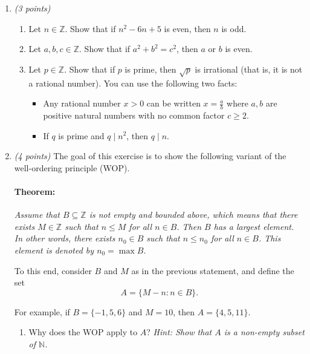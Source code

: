 \documentclass[11pt]{article}
\begin{document}
\begin{enumerate}

\item \emph{(3 points)}

\begin{enumerate}
\item Let \(n \in \mathbb{Z}\). Show that if \(n^2 - 6n + 5\) is even, then \(n\) is odd.\newline
\item Let \(a, b, c \in \mathbb{Z}\). Show that if \(a^2 + b^2 = c^2\), then \(a\) or \(b\) is even.\newline
\item Let \(p \in \mathbb{Z}\). Show that if \(p\) is prime, then \(\sqrt{p}\) is irrational (that is, it is not a rational number). You can use the following two facts:
\begin{itemize}
\item Any rational number \(x > 0\) can be written \(x = \frac{a}{b}\) where \(a, b\) are positive natural numbers with no common factor \(c \geq 2\).
\item If \(q\) is prime and \(q \mid n^2\), then \(q \mid n\).
\end{itemize} 
\end{enumerate}


\item \emph{(4 points)} The goal of this exercise is to show the following variant of the well-ordering principle (WOP).
\paragraph{Theorem:}
\emph{Assume that \(B \subseteq \mathbb{Z}\) is not empty and bounded above, which means that there exists \(M \in \mathbb{Z}\) such that \(n \leq M\) for all \(n \in B\). Then \(B\) has a largest element. In other words, there exists \(n_0 \in B\) such that \(n \leq n_0\) for all \(n \in B\). This element is denoted by \(n_0 = \max B\).}

To this end, consider \(B\) and \(M\) as in the previous statement, and define the set
\[
A = \{ M - n : n \in B\}.
\]

For example, if \( B=\{-1, 5,6\}\) and \( M=10\), then \(A=\{4, 5,11\}\).

\begin{enumerate}
\item Why does the WOP apply to \(A\)? \newline
\emph{Hint: Show that \( A\) is a non-empty subset of \(\mathbb{N}\).} \newline


\end{enumerate}
\end{enumerate}
\end{document}
